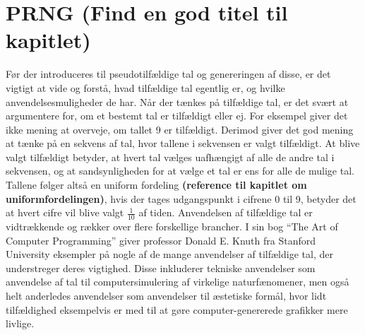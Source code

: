 \section{PRNG (Find en god titel til kapitlet)}
Før der introduceres til pseudotilfældige tal og genereringen af disse, er det vigtigt at vide og forstå, hvad tilfældige tal egentlig er, og hvilke anvendelsesmuligheder de har. Når der tænkes på tilfældige tal, er det svært at argumentere for, om et bestemt tal er tilfældigt eller ej. For eksempel giver det ikke mening at overveje, om tallet 9 er tilfældigt. Derimod giver det god mening at tænke på en sekvens af tal, hvor tallene i sekvensen er valgt tilfældigt. At blive valgt tilfældigt betyder, at hvert tal vælges uafhængigt af alle de andre tal i sekvensen, og at sandsynligheden for at vælge et tal er ens for alle de mulige tal. Tallene følger altså en uniform fordeling \textbf{(reference til kapitlet om uniformfordelingen)}, hvis der tages udgangspunkt i cifrene 0 til 9, betyder det at hvert cifre vil blive valgt $\frac{1}{10}$ af tiden. Anvendelsen af tilfældige tal er vidtrækkende og rækker over flere forskellige brancher. I sin bog “The Art of Computer Programming” 
\cite{Knuth1998}
giver professor Donald E. Knuth fra Stanford University eksempler på nogle af de mange anvendelser af tilfældige tal, der understreger deres vigtighed. Disse inkluderer tekniske anvendelser som anvendelse af tal til computersimulering af virkelige naturfænomener, men også helt anderledes anvendelser som anvendelser til æstetiske formål, hvor lidt tilfældighed eksempelvis er med til at gøre computer-genererede grafikker mere livlige.

